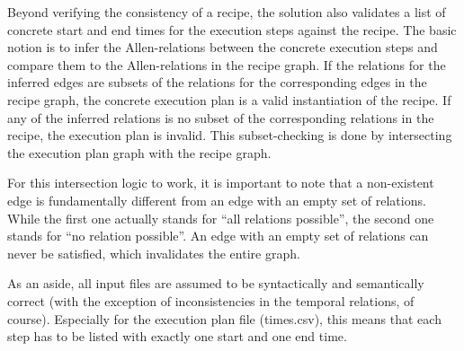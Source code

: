     Beyond verifying the consistency of a recipe, the solution also validates a
    list of concrete start and end times for the execution steps against the
    recipe. The basic notion is to infer the Allen-relations between the
    concrete execution steps and compare them to the Allen-relations in the
    recipe graph. If the relations for the inferred edges are subsets of the
    relations for the corresponding edges in the recipe graph, the concrete
    execution plan is a valid instantiation of the recipe. If any of the
    inferred relations is no subset of the corresponding relations in the
    recipe, the execution plan is invalid. This subset-checking is done by
    intersecting the execution plan graph with the recipe graph.
    
    For this
    intersection logic to work, it is important to note that a non-existent edge
    is fundamentally different from an edge with an empty set of relations.
    While the first one actually stands for ``all relations possible'', the
    second one stands for ``no relation possible''. An edge with an empty set of
    relations can never be satisfied, which invalidates the entire graph.

    As an aside, all input files are assumed to be syntactically and
    semantically correct (with the exception of inconsistencies in the temporal
    relations, of course). Especially for the execution plan file (times.csv),
    this means that each step has to be listed with exactly one start and one end time.